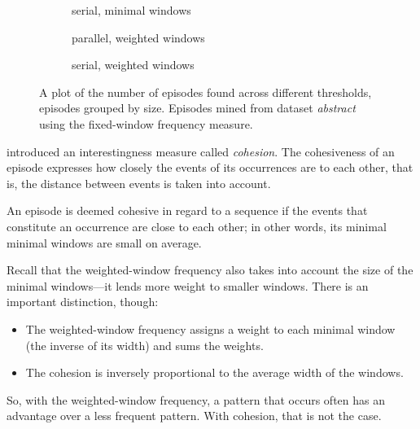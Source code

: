 \begin{figure}
\begin{subfigure}[b]{0.5\textwidth}
\begin{tikzpicture}[scale=0.65]
\end{tikzpicture}
\caption{serial, minimal windows}
\end{subfigure}
\begin{subfigure}[b]{0.5\textwidth}
\centering
{}
\caption{parallel, weighted windows}
\end{subfigure}
\begin{subfigure}[b]{0.5\textwidth}
\centering
{}
\caption{serial, weighted windows}
\end{subfigure}
\caption{A plot of the number of episodes found across different thresholds, episodes grouped by size. Episodes mined from dataset \emph{abstract} using the fixed-window frequency measure.}
\label{fig:episode-frequencies-by-size}
\end{figure}
\citep{cule2016efficient} introduced an interestingness measure called \emph{cohesion}. The cohesiveness of an episode expresses how closely the events of its occurrences are to each other, that is, the distance between events is taken into account.

An episode is deemed cohesive in regard to a sequence if the events that constitute an occurrence are close to each other; in other words, its minimal minimal windows are small on average.

Recall that the weighted-window frequency also takes into account the size of the minimal windows---it lends more weight to smaller windows. There is an important distinction, though:
\begin{itemize}
\item The weighted-window frequency assigns a weight to each minimal window (the inverse of its width) and sums the weights.
\item The cohesion is inversely proportional to the average width of the windows.
\end{itemize}

So, with the weighted-window frequency, a pattern that occurs often has an advantage over a less frequent pattern. With cohesion, that is not the case.

